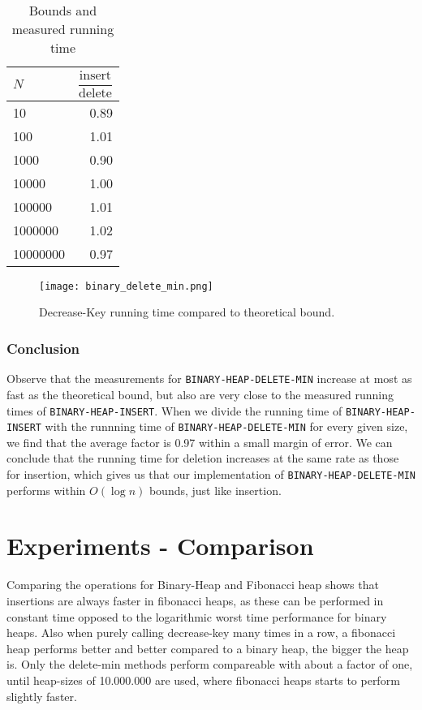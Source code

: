 \documentclass[a4paper,oneside,11pt]{article}
\begin{document}
\begin{table}
  \begin{center}
    \begin{tabular}{l|r}
      $N$ & $\dfrac{\text{insert}}{\text{delete}}$\\
      \hline
      10       & \num{0.89}\\
      100      & \num{1.01}\\
      1000     & \num{0.90}\\
      10000    & \num{1.00}\\
      100000   & \num{1.01}\\
      1000000  & \num{1.02}\\
      10000000 & \num{0.97}
    \end{tabular}
    \caption{Bounds and measured running time}
  \end{center}
\end{table}
\begin{figure}
    \texttt{[image: binary\_delete\_min.png]}
    \caption{Decrease-Key running time compared to theoretical bound.}
\end{figure}

\subsubsection*{Conclusion}
Observe that the measurements for \texttt{BINARY-HEAP-DELETE-MIN} increase at most as fast as the theoretical bound, but also are very close to the measured running times of \texttt{BINARY-HEAP-INSERT}. When we divide the running time of \texttt{BINARY-HEAP-INSERT} with the runnning time of \texttt{BINARY-HEAP-DELETE-MIN} for every given size, we find that the average factor is 0.97 within a small margin of error. We can conclude that the running time for deletion increases at the same rate as those for insertion, which gives us that our implementation of \texttt{BINARY-HEAP-DELETE-MIN} performs within $O(\log n)$ bounds, just like insertion.

\section*{Experiments - Comparison}
Comparing the operations for Binary-Heap and Fibonacci heap shows that insertions are always faster in fibonacci heaps, as these can be performed in constant time opposed to the logarithmic worst time performance for binary heaps. Also when purely calling decrease-key many times in a row, a fibonacci heap performs better and better compared to a binary heap, the bigger the heap is. Only the delete-min methods perform compareable with about a factor of one, until heap-sizes of 10.000.000 are used, where fibonacci heaps starts to perform slightly faster.
\end{document}

